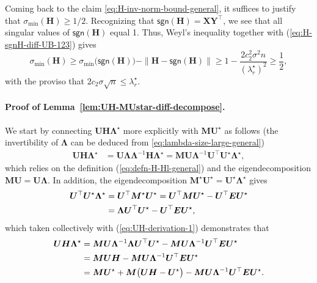 Coming back to the claim \eqref{eq:H-inv-norm-bound-general}, it
suffices to justify that $\sigma_{\min}(\bm{H})\geq1/2$. Recognizing
that $\mathsf{sgn}(\bm{H})=\bm{X}\bm{Y}^{\top}$, we see that all
singular values of $\mathsf{sgn}(\bm{H})$ equal 1. Thus, Weyl's inequality
together with (\ref{eq:H-sgnH-diff-UB-123}) gives
\[
\sigma_{\min}(\bm{H})\geq\sigma_{\min}\big(\mathsf{sgn}(\bm{H})\big)-\|\bm{H}-\mathsf{sgn}(\bm{H})\|\geq1-\frac{2c_{2}^{2}\sigma^{2}n}{(\lambda_{r}^{\star})^{2}}\geq\frac{1}{2},
\]
with the proviso that $2c_{2}\sigma\sqrt{n}\leq\lambda_{r}^{\star}$.


\paragraph{Proof of Lemma~\ref{lem:UH-MUstar-diff-decompose}.}
We start by connecting $\bm{U}\bm{H}\bm{\Lambda}^{\star}$ more explicitly with $\bm{M}\bm{U}^{\star}$ as follows (the invertibility of $\bm{\Lambda}$ can be deduced from \eqref{eq:lambda-size-large-general})
%
\begin{align}
	\bm{U}\bm{H}\bm{\Lambda}^{\star} & =\bm{U}\bm{\Lambda}\bm{\Lambda}^{-1}\bm{H}\bm{\Lambda}^{\star}
	=\bm{M}\bm{U}\bm{\Lambda}^{-1}\bm{U}^{\top}\bm{U}^{\star}\bm{\Lambda}^{\star},\label{eq:UH-derivation-1}
\end{align}
%
which relies on the definition (\ref{eq:defn-H-Hl-general})
and the eigendecomposition $\bm{M}\bm{U}=\bm{U}\bm{\Lambda}$. In
addition, the eigendecomposition $\bm{M}^{\star}\bm{U}^{\star}=\bm{U}^{\star}\bm{\Lambda}^{\star}$ gives
%
\begin{align}
	\bm{U}^{\top}\bm{U}^{\star}\bm{\Lambda}^{\star}
	&=\bm{U}^{\top}\bm{M}^{\star}\bm{U}^{\star}=\bm{U}^{\top}\bm{M}\bm{U}^{\star}-\bm{U}^{\top}\bm{E}\bm{U}^{\star} \notag\\
	&= \bm{\Lambda}\bm{U}^{\top}\bm{U}^{\star}-\bm{U}^{\top}\bm{E}\bm{U}^{\star},
	\label{eq:HLambda-Lambda-H-connection}
\end{align}
%
which taken collectively with  (\ref{eq:UH-derivation-1}) demonstrates that
%
\begin{align}
\bm{U}\bm{H}\bm{\Lambda}^{\star} & =\bm{M}\bm{U}\bm{\Lambda}^{-1}\bm{\Lambda}\bm{U}^{\top}\bm{U}^{\star}-\bm{M}\bm{U}\bm{\Lambda}^{-1}\bm{U}^{\top}\bm{E}\bm{U}^{\star} \notag\\
 & =\bm{M}\bm{U}\bm{H}-\bm{M}\bm{U}\bm{\Lambda}^{-1}\bm{U}^{\top}\bm{E}\bm{U}^{\star} \notag\\
 & =\bm{M}\bm{U}^{\star}+\bm{M}\big(\bm{U}\bm{H}-\bm{U}^{\star}\big)-\bm{M}\bm{U}\bm{\Lambda}^{-1}\bm{U}^{\top}\bm{E}\bm{U}^{\star}.
\notag
\end{align}
